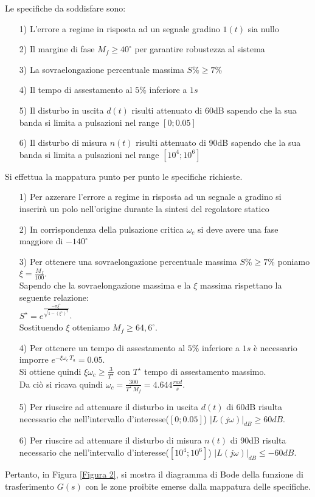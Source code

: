 \documentclass[a4paper, 11pt]{article}
\begin{document}
Le specifiche da soddisfare sono:
\begin{itemize}
	\item[1)] L'errore a regime in risposta ad un segnale gradino $1(t)$ sia nullo\label{spec1}
	\item[2)] Il margine di fase $M_f\ge40^{\circ}$ per garantire robustezza al sistema\label{spec2}
	\item[3)] La sovraelongazione percentuale massima $S\%\ge7\%$\label{spec3}
	\item[4)] Il tempo di assestamento al $5\%$ inferiore a $1s$\label{spec4}
	\item[5)] Il disturbo in uscita $d(t)$ risulti attenuato di 60dB sapendo che la sua banda si limita a pulsazioni nel range $[0;0.05]$\label{spec5}
	\item[6)] Il disturbo di misura $n(t)$ risulti attenuato di 90dB sapendo che la sua banda si limita a pulsazioni nel range $[10^4;10^6]$\label{spec6}
\end{itemize}
%
Si effettua la mappatura punto per punto le specifiche richieste. 
\begin{itemize}
	\item[1)] Per azzerare l'errore a regime in risposta ad un segnale a gradino si inserirà un polo nell'origine durante la sintesi del regolatore statico\
	\item[2)] In corrispondenza della pulsazione critica $\omega_c$ si deve avere una fase maggiore di $-140^{\circ}$\
	\item[3)] Per ottenere una sovraelongazione percentuale massima $S\%\ge7\%$ poniamo $\xi=\frac{M_f}{100}$.
	\\
	Sapendo che la sovraelongazione massima e la $\xi$ massima rispettano la seguente relazione:\\
	 $S^\star=e^\frac{-\pi\xi^\star}{\sqrt{1-(\xi^\star)^2}}$.
	 \\
	 Sostituendo $\xi$ otteniamo $M_f\ge64,6^{\circ}$.
	\item[4)] Per ottenere un tempo di assestamento al $5\%$ inferiore a $1s$ è necessario imporre $e^{-\xi\omega_c\,T_a}=0.05$.\\
	Si ottiene quindi $\xi\omega_c\ge\frac{3}{T^\star}$ con $T^\star$ tempo di assestamento massimo.\\
	Da ciò si ricava quindi $\omega_c=\frac{300}{T^\star\,M_f}=4.644\frac{rad}{s}$.
	\item[5)] Per riuscire ad attenuare il disturbo in uscita $d(t)$ di 60dB risulta necessario che nell'intervallo d'interesse($[0;0.05]$) $|L(j\omega)|_{dB}\ge60dB$.\
	\item[6)] Per riuscire ad attenuare il disturbo di misura $n(t)$ di 90dB risulta necessario che nell'intervallo d'interesse($[10^4;10^6]$) $|L(j\omega)|_{dB}\le-60dB$.\
\end{itemize}
Pertanto, in Figura \ref{Figura 2}, si mostra il diagramma di Bode della funzione di trasferimento $G(s)$ con le zone proibite emerse dalla mappatura delle specifiche.
\end{document}
